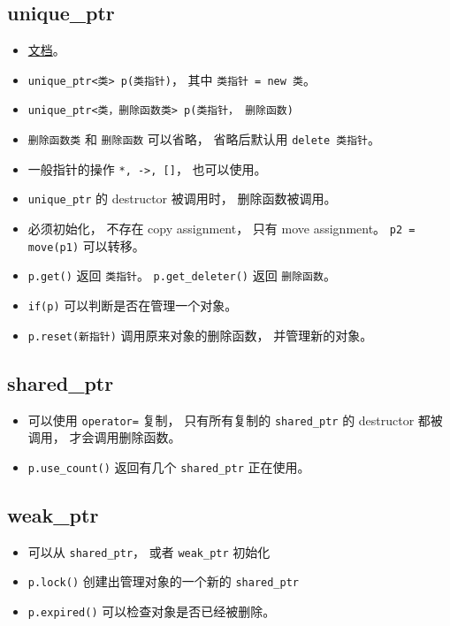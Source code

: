 
\begin{issues}
\issueDraft
\end{issues}

\subsection{unique\_ptr}
\begin{itemize}
\item \href{https://en.cppreference.com/w/cpp/memory/unique_ptr}{文档}。
\item \verb|unique_ptr<类> p(类指针)|， 其中 \verb|类指针 = new 类|。
\item \verb|unique_ptr<类，删除函数类> p(类指针， 删除函数)|
\item \verb|删除函数类| 和 \verb|删除函数| 可以省略， 省略后默认用 \verb|delete 类指针|。
\item 一般指针的操作 \verb|*, ->, []|， 也可以使用。
\item \verb|unique_ptr| 的 destructor 被调用时， 删除函数被调用。
\item 必须初始化， 不存在 copy assignment， 只有 move assignment。 \verb|p2 = move(p1)| 可以转移。
\item \verb|p.get()| 返回 \verb|类指针|。 \verb|p.get_deleter()| 返回 \verb|删除函数|。
\item \verb|if(p)| 可以判断是否在管理一个对象。
\item \verb|p.reset(新指针)| 调用原来对象的删除函数， 并管理新的对象。
\end{itemize}

\subsection{shared\_ptr}
\begin{itemize}
\item 可以使用 \verb|operator=| 复制， 只有所有复制的 \verb|shared_ptr| 的 destructor 都被调用， 才会调用删除函数。
\item \verb|p.use_count()| 返回有几个 \verb|shared_ptr| 正在使用。
\end{itemize}

\subsection{weak\_ptr}
\begin{itemize}
\item 可以从 \verb|shared_ptr|， 或者 \verb|weak_ptr| 初始化
\item \verb|p.lock()| 创建出管理对象的一个新的 \verb|shared_ptr|
\item \verb|p.expired()| 可以检查对象是否已经被删除。
\end{itemize}
